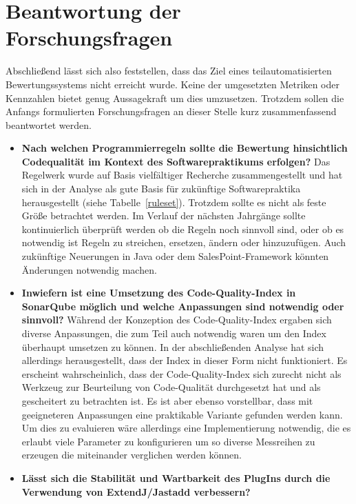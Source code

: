 \documentclass[da,ngerman]{stthesis}
\begin{document}
  		\section{Beantwortung der Forschungsfragen}
			Abschließend lässt sich also feststellen, dass das Ziel eines teilautomatisierten Bewertungssystems nicht erreicht wurde. Keine der umgesetzten Metriken oder Kennzahlen bietet genug Aussagekraft um dies umzusetzen. Trotzdem sollen die Anfangs formulierten Forschungsfragen an dieser Stelle kurz zusammenfassend beantwortet werden.
			\begin{itemize}
				\item \textbf{Nach welchen Programmierregeln sollte die Bewertung hinsichtlich Codequalität im Kontext des Softwarepraktikums erfolgen?} \newline \newline
				Das Regelwerk wurde auf Basis vielfältiger Recherche zusammengestellt und hat sich in der Analyse als gute Basis für zukünftige Softwarepraktika herausgestellt (siehe Tabelle~\ref{ruleset}). Trotzdem sollte es nicht als feste Größe betrachtet werden. Im Verlauf der nächsten Jahrgänge sollte kontinuierlich überprüft werden ob die Regeln noch sinnvoll sind, oder ob es notwendig ist Regeln zu streichen, ersetzen, ändern oder hinzuzufügen. Auch zukünftige Neuerungen in Java oder dem SalesPoint-Framework könnten Änderungen notwendig machen.
				\item \textbf{Inwiefern ist eine Umsetzung des Code-Quality-Index in SonarQube möglich und welche Anpassungen sind notwendig oder sinnvoll?} \newline \newline
				Während der Konzeption des Code-Quality-Index ergaben sich diverse Anpassungen, die zum Teil auch notwendig waren um den Index überhaupt umsetzen zu können. In der abschließenden Analyse hat sich allerdings herausgestellt, dass der Index in dieser Form nicht funktioniert. Es erscheint wahrscheinlich, dass der Code-Quality-Index sich zurecht nicht als Werkzeug zur Beurteilung von Code-Qualität durchgesetzt hat und als gescheitert zu betrachten ist. Es ist aber ebenso vorstellbar, dass mit geeigneteren Anpassungen eine praktikable Variante gefunden werden kann. Um dies zu evaluieren wäre allerdings eine Implementierung notwendig, die es erlaubt viele Parameter zu konfigurieren um so diverse Messreihen zu erzeugen die miteinander verglichen werden können.
				\item \textbf{Lässt sich die Stabilität und Wartbarkeit des PlugIns durch die Verwendung von ExtendJ/Jastadd verbessern?} \newline \newline

\end{itemize}
\end{document}
